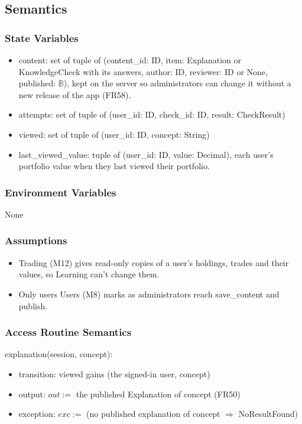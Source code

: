 \documentclass[12pt, titlepage]{article}
\begin{document}
\subsection{Semantics}

\subsubsection{State Variables}

\begin{itemize}
\item content: set of tuple of (content\_id: ID, item: Explanation or
  KnowledgeCheck with its answers, author: ID, reviewer: ID or None,
  published: $\mathbb{B}$), kept on the server so administrators can change it
  without a new release of the app (FR58).
\item attempts: set of tuple of (user\_id: ID, check\_id: ID, result:
  CheckResult)
\item viewed: set of tuple of (user\_id: ID, concept: String)
\item last\_viewed\_value: tuple of (user\_id: ID, value: Decimal), each
  user's portfolio value when they last viewed their portfolio.
\end{itemize}

\subsubsection{Environment Variables}

None

\subsubsection{Assumptions}

\begin{itemize}
\item Trading (M12) gives read-only copies of a user's holdings, trades and
  their values, so Learning can't change them.
\item Only users Users (M8) marks as administrators reach save\_content and
  publish.
\end{itemize}

\subsubsection{Access Routine Semantics}

\noindent explanation(session, concept):
\begin{itemize}
\item transition: viewed gains (the signed-in user, concept)
\item output: $out :=$ the published Explanation of concept (FR50)
\item exception: $exc :=$ (no published explanation of concept
  $\Rightarrow$ NoResultFound)
\end{itemize}
\end{document}
